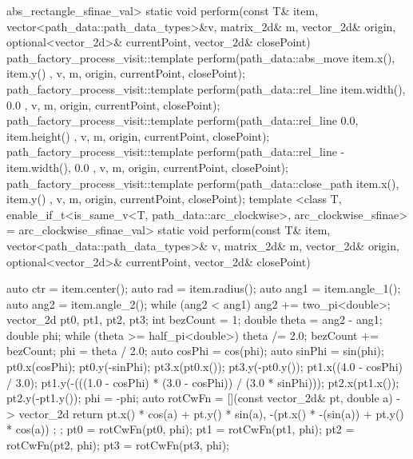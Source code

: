 \begin{codeblock}
{{        abs_rectangle_sfinae_val>
      static void perform(const T& item, vector<path_data::path_data_types>&v, 
        matrix_2d& m, vector_2d& origin, optional<vector_2d>& currentPoint, 
        vector_2d& closePoint) {
        path_factory_process_visit::template perform(path_data::abs_move{ { 
          item.x(), item.y() } }, v, m, origin, currentPoint, closePoint);
        path_factory_process_visit::template perform(path_data::rel_line{ { 
          item.width(), 0.0 } }, v, m, origin, currentPoint, closePoint);
        path_factory_process_visit::template perform(path_data::rel_line{ { 
          0.0, item.height() } }, v, m, origin, currentPoint, closePoint);
        path_factory_process_visit::template perform(path_data::rel_line{ { 
          -item.width(), 0.0 } }, v, m, origin, currentPoint, closePoint);
        path_factory_process_visit::template perform(path_data::close_path{ { 
          item.x(), item.y() } }, v, m, origin, currentPoint, closePoint);
      }
      template <class T, enable_if_t<is_same_v<T, path_data::arc_clockwise>, 
        arc_clockwise_sfinae> = arc_clockwise_sfinae_val>
      static void perform(const T& item, vector<path_data::path_data_types>& v, 
        matrix_2d& m, vector_2d& origin, optional<vector_2d>& currentPoint, 
        vector_2d& closePoint) {
        {
          auto ctr = item.center();
          auto rad = item.radius();
          auto ang1 = item.angle_1();
          auto ang2 = item.angle_2();
          while (ang2 < ang1) {
            ang2 += two_pi<double>;
          }
          vector_2d pt0, pt1, pt2, pt3;
          int bezCount = 1;
          double theta = ang2 - ang1;
          double phi{};
          while (theta >= half_pi<double>) {
            theta /= 2.0;
            bezCount += bezCount;
          }
          phi = theta / 2.0;
          auto cosPhi = cos(phi);
          auto sinPhi = sin(phi);
          pt0.x(cosPhi);
          pt0.y(-sinPhi);
          pt3.x(pt0.x());
          pt3.y(-pt0.y());
          pt1.x((4.0 - cosPhi) / 3.0);
          pt1.y(-(((1.0 - cosPhi) * (3.0 - cosPhi)) / (3.0 * sinPhi)));
          pt2.x(pt1.x());
          pt2.y(-pt1.y());
          phi = -phi;
          auto rotCwFn = [](const vector_2d& pt, double a) -> vector_2d {
            return { pt.x() * cos(a) + pt.y() * sin(a),
              -(pt.x() * -(sin(a)) + pt.y() * cos(a)) };
          };
          pt0 = rotCwFn(pt0, phi);
          pt1 = rotCwFn(pt1, phi);
          pt2 = rotCwFn(pt2, phi);
          pt3 = rotCwFn(pt3, phi);

}}}}
\end{codeblock}
